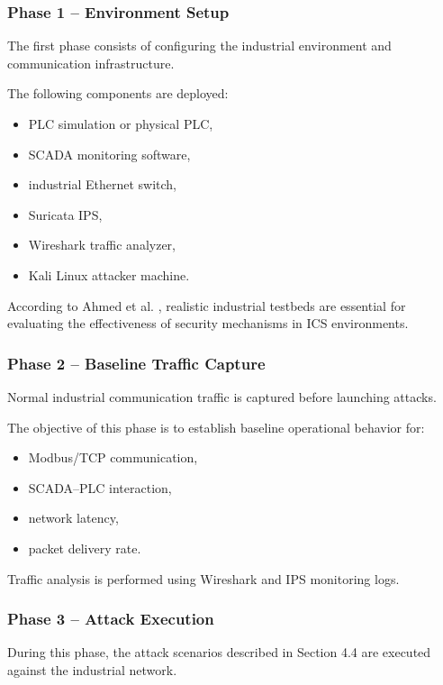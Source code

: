 \documentclass[sigconf]{acmart}
\begin{document}
\subsubsection{Phase 1 -- Environment Setup}

The first phase consists of configuring the industrial environment and communication infrastructure.

The following components are deployed:
\begin{itemize}
    \item PLC simulation or physical PLC,
    \item SCADA monitoring software,
    \item industrial Ethernet switch,
    \item Suricata IPS,
    \item Wireshark traffic analyzer,
    \item Kali Linux attacker machine.
\end{itemize}

According to Ahmed et al. \cite{ahmed2019survey}, realistic industrial testbeds are essential for evaluating the effectiveness of security mechanisms in ICS environments.

\subsubsection{Phase 2 -- Baseline Traffic Capture}

Normal industrial communication traffic is captured before launching attacks.

The objective of this phase is to establish baseline operational behavior for:
\begin{itemize}
    \item Modbus/TCP communication,
    \item SCADA--PLC interaction,
    \item network latency,
    \item packet delivery rate.
\end{itemize}

Traffic analysis is performed using Wireshark and IPS monitoring logs.

\subsubsection{Phase 3 -- Attack Execution}

During this phase, the attack scenarios described in Section 4.4 are executed against the industrial network.
\end{document}
